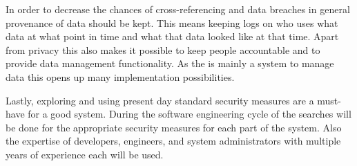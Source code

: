 In order to decrease the chances of cross-referencing and data breaches in general provenance of data should be kept.
This means keeping logs on who uses what data at what point in time and what that data looked like at that time.
Apart from privacy this also makes it possible to keep people accountable and to provide data management functionality.
As the \ivfsystem{} is mainly a system to manage data this opens up many implementation possibilities.

Lastly, exploring and using present day standard security measures are a must-have for a good system.
During the software engineering cycle of the \ivfsystem{} searches will be done for the appropriate security measures for each part of the system.
Also the expertise of developers, engineers, and system administrators with multiple years of experience each will be used.